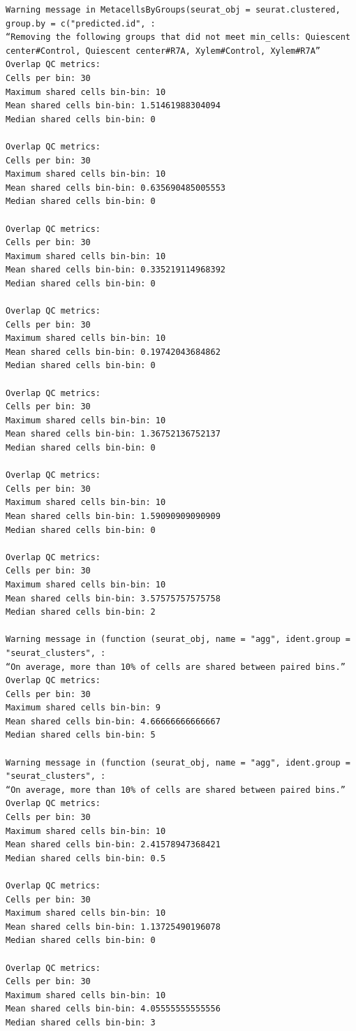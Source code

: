 \documentclass[
  letterpaper,
  DIV=11,
  numbers=noendperiod]{scrartcl}
\begin{document}
\begin{verbatim}
Warning message in MetacellsByGroups(seurat_obj = seurat.clustered, group.by = c("predicted.id", :
“Removing the following groups that did not meet min_cells: Quiescent center#Control, Quiescent center#R7A, Xylem#Control, Xylem#R7A”
Overlap QC metrics:
Cells per bin: 30
Maximum shared cells bin-bin: 10
Mean shared cells bin-bin: 1.51461988304094
Median shared cells bin-bin: 0

Overlap QC metrics:
Cells per bin: 30
Maximum shared cells bin-bin: 10
Mean shared cells bin-bin: 0.635690485005553
Median shared cells bin-bin: 0

Overlap QC metrics:
Cells per bin: 30
Maximum shared cells bin-bin: 10
Mean shared cells bin-bin: 0.335219114968392
Median shared cells bin-bin: 0

Overlap QC metrics:
Cells per bin: 30
Maximum shared cells bin-bin: 10
Mean shared cells bin-bin: 0.19742043684862
Median shared cells bin-bin: 0

Overlap QC metrics:
Cells per bin: 30
Maximum shared cells bin-bin: 10
Mean shared cells bin-bin: 1.36752136752137
Median shared cells bin-bin: 0

Overlap QC metrics:
Cells per bin: 30
Maximum shared cells bin-bin: 10
Mean shared cells bin-bin: 1.59090909090909
Median shared cells bin-bin: 0

Overlap QC metrics:
Cells per bin: 30
Maximum shared cells bin-bin: 10
Mean shared cells bin-bin: 3.57575757575758
Median shared cells bin-bin: 2

Warning message in (function (seurat_obj, name = "agg", ident.group = "seurat_clusters", :
“On average, more than 10% of cells are shared between paired bins.”
Overlap QC metrics:
Cells per bin: 30
Maximum shared cells bin-bin: 9
Mean shared cells bin-bin: 4.66666666666667
Median shared cells bin-bin: 5

Warning message in (function (seurat_obj, name = "agg", ident.group = "seurat_clusters", :
“On average, more than 10% of cells are shared between paired bins.”
Overlap QC metrics:
Cells per bin: 30
Maximum shared cells bin-bin: 10
Mean shared cells bin-bin: 2.41578947368421
Median shared cells bin-bin: 0.5

Overlap QC metrics:
Cells per bin: 30
Maximum shared cells bin-bin: 10
Mean shared cells bin-bin: 1.13725490196078
Median shared cells bin-bin: 0

Overlap QC metrics:
Cells per bin: 30
Maximum shared cells bin-bin: 10
Mean shared cells bin-bin: 4.05555555555556
Median shared cells bin-bin: 3


\end{verbatim}
\end{document}
